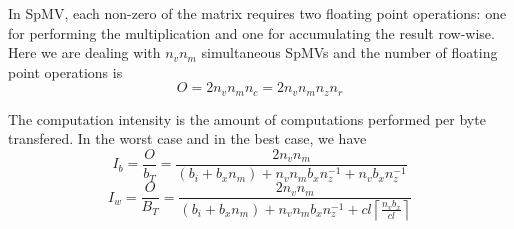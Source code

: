 \documentclass[10pt,conference,compsocconf]{IEEEtran}
\newcommand{\ceil}[1]{\left\lceil#1\right\rceil}
\begin{document}
In SpMV, each non-zero of the matrix requires two floating point
operations: one for performing the multiplication and one for
accumulating the result row-wise. Here we are dealing with $n_v n_m$
simultaneous SpMVs and the number of floating point operations is
$$O = 2 n_v n_m n_c = 2 n_v n_m n_z n_r$$

The computation intensity is the amount of computations performed per
byte transfered. In the worst case and in the best case, we have
$$I_b = \frac{O}{b_T} = \frac{2 n_v n_m}{ (b_i + b_x n_m) + n_v n_m b_x n_z^{-1} + n_v b_x n_z^{-1} }$$
$$I_w = \frac{O}{B_T} = \frac{2 n_v n_m}{(b_i+b_x n_m) + n_v n_m b_x n_z^{-1} + cl \ceil{\frac{n_vb_x}{cl}} }$$



\end{document}
